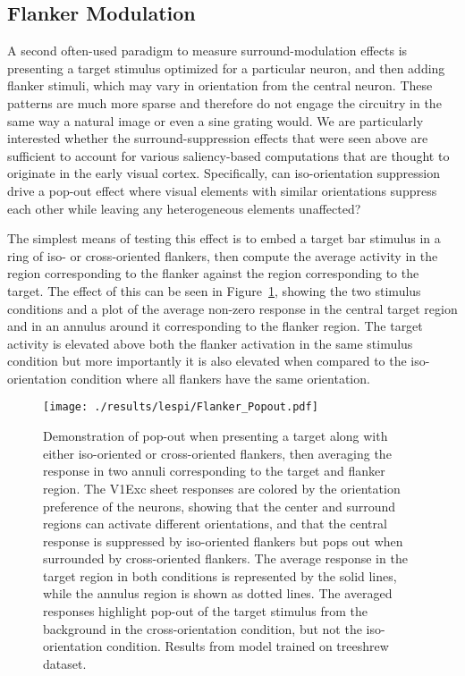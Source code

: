 \subsection{Flanker Modulation}

A second often-used paradigm to measure surround-modulation effects is
presenting a target stimulus optimized for a particular neuron, and
then adding flanker stimuli, which may vary in orientation from the
central neuron. These patterns are much more sparse and therefore do
not engage the circuitry in the same way a natural image or
even a sine grating would. We are particularly interested
whether the surround-suppression effects that were seen above are
sufficient to account for various saliency-based computations that are
thought to originate in the early visual cortex. Specifically, can
iso-orientation suppression drive a pop-out effect where visual
elements with similar orientations suppress each other while
leaving any heterogeneous elements unaffected?

The simplest means of testing this effect is to embed a target bar
stimulus in a ring of iso- or cross-oriented flankers, then compute
the average activity in the region corresponding to the flanker
against the region corresponding to the target. The
effect of this can be seen in Figure~\ref{Flanker_PopOut}, showing the
two stimulus conditions and a plot of the average non-zero response in
the central target region and in an annulus around it corresponding to
the flanker region. The target activity is elevated above both the
flanker activation in the same stimulus condition but more importantly
it is also elevated when compared to the iso-orientation condition
where all flankers have the same orientation.

\begin{figure}
	\centering
        \texttt{[image: ./results/lespi/Flanker\_Popout.pdf]}
	\caption[Pop-out effect in simple flanker paradigm.]{Demonstration
      of pop-out when presenting a target along with either
      iso-oriented or cross-oriented flankers, then averaging the
      response in two annuli corresponding to the target and flanker
      region. The V1Exc sheet responses are colored by the
      orientation preference of the neurons, showing that the center
      and surround regions can activate different orientations, and
      that the central response is suppressed by iso-oriented flankers
      but pops out when surrounded by cross-oriented flankers.
      The average response in the target region in both
      conditions is represented by the solid lines, while the annulus
      region is shown as dotted lines. The averaged responses
      highlight pop-out of the target stimulus from the background in
      the cross-orientation condition, but not the iso-orientation
      condition. Results from model trained on treeshrew dataset.}
	\label{Flanker_PopOut}
\end{figure}

